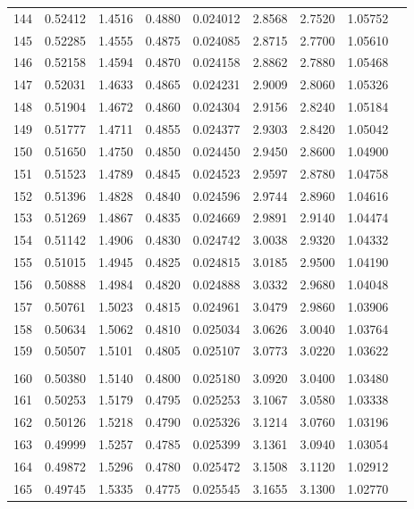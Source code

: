\documentclass[letter,twosides,10pt]{article}
\begin{document}
\begin{longtable}{|c|c|c|c|c|c|c|c|c|}
144 & 0.52412 & 1.4516 & 0.4880 & 0.024012 & 2.8568 &  2.7520 & 1.05752 \\
145 & 0.52285 & 1.4555 & 0.4875 & 0.024085 & 2.8715 &  2.7700 & 1.05610 \\
146 & 0.52158 & 1.4594 & 0.4870 & 0.024158 & 2.8862 &  2.7880 & 1.05468 \\
147 & 0.52031 & 1.4633 & 0.4865 & 0.024231 & 2.9009 &  2.8060 & 1.05326 \\
148 & 0.51904 & 1.4672 & 0.4860 & 0.024304 & 2.9156 &  2.8240 & 1.05184 \\
149 & 0.51777 & 1.4711 & 0.4855 & 0.024377 & 2.9303 &  2.8420 & 1.05042 \\
150 & 0.51650 & 1.4750 & 0.4850 & 0.024450 & 2.9450 &  2.8600 & 1.04900 \\
151 & 0.51523 & 1.4789 & 0.4845 & 0.024523 & 2.9597 &  2.8780 & 1.04758 \\
152 & 0.51396 & 1.4828 & 0.4840 & 0.024596 & 2.9744 &  2.8960 & 1.04616 \\
153 & 0.51269 & 1.4867 & 0.4835 & 0.024669 & 2.9891 &  2.9140 & 1.04474 \\
154 & 0.51142 & 1.4906 & 0.4830 & 0.024742 & 3.0038 &  2.9320 & 1.04332 \\
155 & 0.51015 & 1.4945 & 0.4825 & 0.024815 & 3.0185 &  2.9500 & 1.04190 \\
156 & 0.50888 & 1.4984 & 0.4820 & 0.024888 & 3.0332 &  2.9680 & 1.04048 \\
157 & 0.50761 & 1.5023 & 0.4815 & 0.024961 & 3.0479 &  2.9860 & 1.03906 \\
158 & 0.50634 & 1.5062 & 0.4810 & 0.025034 & 3.0626 &  3.0040 & 1.03764 \\
159 & 0.50507 & 1.5101 & 0.4805 & 0.025107 & 3.0773 &  3.0220 & 1.03622 \\
 & & & & & & & \\
160 & 0.50380 & 1.5140 & 0.4800 & 0.025180 & 3.0920 &  3.0400 & 1.03480 \\
161 & 0.50253 & 1.5179 & 0.4795 & 0.025253 & 3.1067 &  3.0580 & 1.03338 \\
162 & 0.50126 & 1.5218 & 0.4790 & 0.025326 & 3.1214 &  3.0760 & 1.03196 \\
163 & 0.49999 & 1.5257 & 0.4785 & 0.025399 & 3.1361 &  3.0940 & 1.03054 \\
164 & 0.49872 & 1.5296 & 0.4780 & 0.025472 & 3.1508 &  3.1120 & 1.02912 \\
165 & 0.49745 & 1.5335 & 0.4775 & 0.025545 & 3.1655 &  3.1300 & 1.02770 \\

\end{longtable}
\end{document}
